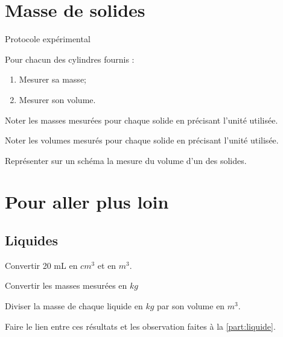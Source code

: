 \documentclass[a4paper,11pt]{exam}
\begin{document}
\section{Masse de solides}

\begin{doc}[h!]
	\caption{Protocole expérimental}
	\label{doc:proto2}
	
	Pour chacun des cylindres fournis :

		
		\begin{enumerate}[label=\arabic*)]
			\item Mesurer sa masse;
			\item Mesurer son volume.			
		\end{enumerate}

\end{doc}	


\begin{questions}
	
	\question Noter les masses mesurées pour chaque solide en précisant l'unité utilisée.
	\fillwithdottedlines{3cm}
	
	\question Noter les volumes mesurés pour chaque solide en précisant l'unité utilisée.
	\fillwithdottedlines{3cm}
	
	\question Représenter sur un schéma la mesure du volume d'un des solides.
	\makeemptybox{8cm}
\end{questions}

\newpage

\section{Pour aller plus loin}

\subsection{Liquides}
	\begin{questions}
		\question Convertir 20 mL en $cm^3$ et en $m^3$.
		
		\fillwithdottedlines{1cm}
		
		\question Convertir les masses mesurées en $kg$
		
		\fillwithdottedlines{2cm}
		
		\question Diviser la masse de chaque liquide en $kg$ par son volume en $m^3$.
		
		\fillwithdottedlines{2cm}
		
		\question Faire le lien entre ces résultats et les observation faites à la \ref{part:liquide}.
		
		\fillwithdottedlines{3cm}
		
	\end{questions}
\end{document}
